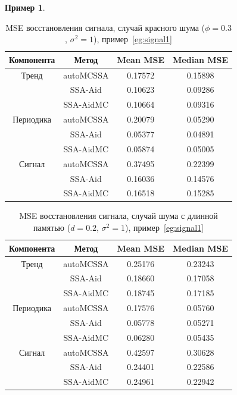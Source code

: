 \documentclass[specialist,
substylefile = spbu_report.rtx,
subf,12pt]{disser}
\theoremstyle{definition}
\newtheorem{example}{Пример}[chapter]
\begin{document}
\begin{example}
	\begin{table}[h!]
        \centering
		\caption{MSE восстановления сигнала, случай красного шума ($\phi=0.3$, $\sigma^2=1$), пример~\ref{eg:signal1}}
	\label{tab:mse_signal1_rn}
		\begin{tabular}{c|c|c|c}
			Компонента & Метод & Mean MSE & Median MSE \\
			\hline
			Тренд & autoMCSSA & 0.17572  & 0.15898 \\
			& SSA-Aid & 0.10623  & 0.09286 \\
			& SSA-AidMC & 0.10664  & 0.09316 \\
			\hline
			Периодика & autoMCSSA & 0.20079  & 0.05290 \\
			& SSA-Aid & 0.05377  & 0.04891 \\
			& SSA-AidMC & 0.05874  & 0.05005 \\
			\hline
			Сигнал & autoMCSSA & 0.37495  & 0.22399 \\
			& SSA-Aid & 0.16036  & 0.14576 \\
			& SSA-AidMC & 0.16518  & 0.15285 \\
			\hline
		\end{tabular}
    \end{table}

	\begin{table}[h!]
        \centering
		\caption{MSE восстановления сигнала, случай шума с длинной памятью ($d=0.2$, $\sigma^2=1$), пример~\ref{eg:signal1}}
	\label{tab:mse_signal1_fi}
		 \begin{tabular}{c|c|c|c}
			Компонента & Метод & Mean MSE & Median MSE \\
			\hline
			Тренд & autoMCSSA & 0.25176  & 0.23243 \\
			& SSA-Aid & 0.18660  & 0.17058 \\
			& SSA-AidMC & 0.18745  & 0.17185 \\
			\hline
			Периодика & autoMCSSA & 0.17576  & 0.05760 \\
			& SSA-Aid & 0.05778  & 0.05271 \\
			& SSA-AidMC & 0.06280  & 0.05435 \\
			\hline
			Сигнал & autoMCSSA & 0.42597  & 0.30628 \\
			& SSA-Aid & 0.24401  & 0.22586 \\
			& SSA-AidMC & 0.24961  & 0.22942 \\
			\hline
			\end{tabular}
    \end{table}
\end{example}
\end{document}
